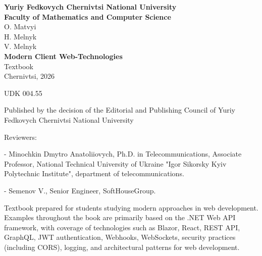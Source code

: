 \documentclass[a4paper,12pt]{report}
\begin{document}
\pagestyle{plain}

\begin{large}

\begin{titlepage}
    \begin{center}
        {\Large \textbf{Yuriy Fedkovych Chernivtsi National University \\
Faculty of Mathematics and Computer Science}} \\[5cm]   %

        {\Large O. Matvyi} \\
        {\Large H. Melnyk} \\
        {\Large V. Melnyk} \\[6cm]                   %

        {\Huge \textbf{Modern Client Web-Technologies}} \\[0.5cm]
        {\Large Textbook} \\[9cm]                        %

        {\large Chernivtsi, 2026}                              %
    \end{center}
\end{titlepage}

\newpage
\thispagestyle{empty}   %


UDK 004.55


\begin{center}
    Published by the decision of the Editorial and Publishing Council
of Yuriy Fedkovych Chernivtsi National University
\end{center}

Reviewers:


- Minochkin Dmytro Anatoliiovych, Ph.D. in Telecommunications, Associate Professor, National Technical University of Ukraine
"Igor Sikorsky Kyiv Polytechnic Institute", department of telecommunications.

- Semenov V., Senior Engineer, SoftHouseGroup.


    Textbook prepared for students studying modern approaches in web development. \\[1cm]

    Examples throughout the book are primarily based on the .NET Web API framework,
    with coverage of technologies such as Blazor, React, REST API, GraphQL, JWT authentication,
    Webhooks, WebSockets, security practices (including CORS), logging,
    and architectural patterns for web development. \\[1cm]



\end{large}
\end{document}
